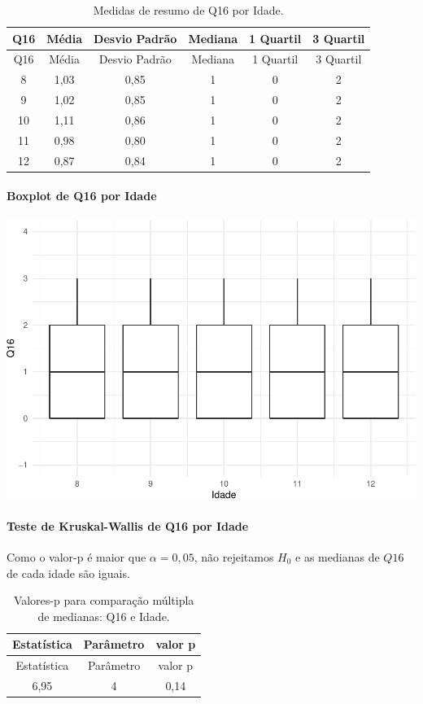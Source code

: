 \documentclass[]{article}
\let\oldparagraph\paragraph
\renewcommand{\paragraph}[1]{\oldparagraph{#1}\mbox{}}
\begin{document}
\begin{longtable}[]{@{}cccccc@{}}
\caption{\label{tab:unnamed-chunk-153}Medidas de resumo de Q16 por Idade.}\tabularnewline
\toprule
Q16 & Média & Desvio Padrão & Mediana & 1 Quartil & 3 Quartil\tabularnewline
\midrule
\endfirsthead
\toprule
Q16 & Média & Desvio Padrão & Mediana & 1 Quartil & 3 Quartil\tabularnewline
\midrule
\endhead
8 & 1,03 & 0,85 & 1 & 0 & 2\tabularnewline
9 & 1,02 & 0,85 & 1 & 0 & 2\tabularnewline
10 & 1,11 & 0,86 & 1 & 0 & 2\tabularnewline
11 & 0,98 & 0,80 & 1 & 0 & 2\tabularnewline
12 & 0,87 & 0,84 & 1 & 0 & 2\tabularnewline
\bottomrule
\end{longtable}

\hypertarget{boxplot-de-q16-por-idade}{%
\paragraph{Boxplot de Q16 por Idade}\label{boxplot-de-q16-por-idade}}

\begin{center}\includegraphics[width=0.75\linewidth]{relatorio_files/figure-latex/unnamed-chunk-154-1} \end{center}

\hypertarget{teste-de-kruskal-wallis-de-q16-por-idade}{%
\paragraph{Teste de Kruskal-Wallis de Q16 por Idade}\label{teste-de-kruskal-wallis-de-q16-por-idade}}

Como o valor-p é maior que \(\alpha=0,05\), não rejeitamos \(H_0\) e as medianas de \(Q16\) de cada idade são iguais.

\begin{longtable}[]{@{}ccc@{}}
\caption{\label{tab:unnamed-chunk-155}Valores-p para comparação múltipla de medianas: Q16 e Idade.}\tabularnewline
\toprule
Estatística & Parâmetro & valor p\tabularnewline
\midrule
\endfirsthead
\toprule
Estatística & Parâmetro & valor p\tabularnewline
\midrule
\endhead
6,95 & 4 & 0,14\tabularnewline
\bottomrule
\end{longtable}
\end{document}

